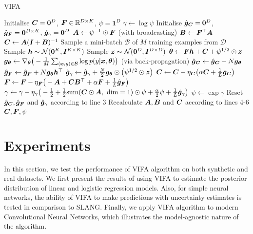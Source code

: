 \documentclass[10pt]{article} %
\begin{document}
\begin{algorithm}[H] 
	\caption{VIFA}
	\label{alg:vi_fa}
	\begin{algorithmic}[1]
		\State Initialise ${\bm{C}} = \bm{0}^D$, ${\bm{F}} \in \mathbb{R}^{D \times K}$, $\psi = \bm{1}^D$
		\State $\gamma \leftarrow \log \psi$
		\State Initialise $\hat{{\bm{g}}}_{\bm{C}} = \bm{0}^D$, $\hat{{\bm{g}}}_{\bm{F}} = \bm{0}^{D \times K}$, $\hat{{\bm{g}}}_\gamma = \bm{0}^D$
		\State ${\bm{A}} \leftarrow \psi^{-1} \odot {\bm{F}}$ (with broadcasting)
		\State ${\bm{B}} \leftarrow {\bm{F}}^\top {\bm{A}}$
		\State ${\bm{C}} \leftarrow {\bm{A}} ({\bm{I}} + {\bm{B}})^{-1}$
			\State Sample a mini-batch $\mathcal{B}$ of $M$ training examples from $\mathcal{D}$
			\State Sample ${\bm{h}} \sim \mathcal{N}(\bm{0}^K, {\bm{I}}^{K \times K})$
			\State Sample ${\bm{z}} \sim \mathcal{N}(\bm{0}^D, {\bm{I}}^{D \times D})$
			\State ${\bm{\theta}} \leftarrow {\bm{F}} {\bm{h}} + {\bm{C}} + \psi^{1/2} \odot {\bm{z}}$
			\State ${\bm{g}}_{\bm{\theta}} \leftarrow \nabla_{\bm{\theta}} \big(-\frac{1}{M} \sum_{({\bm{x}}, y) \in \mathcal{B}} \log p(y | {\bm{x}}, {\bm{\theta}})\big)$ 
			(via back-propagation)
			\State $\hat{{\bm{g}}}_{\bm{C}} \leftarrow \hat{{\bm{g}}}_{\bm{C}} + N {\bm{g}}_{\bm{\theta}}$
			\State $\hat{{\bm{g}}}_{\bm{F}} \leftarrow \hat{{\bm{g}}}_{\bm{F}} + N {\bm{g}}_{\bm{\theta}} {\bm{h}}^\top$
			\State $\hat{{\bm{g}}}_\gamma \leftarrow \hat{{\bm{g}}}_\gamma + \frac{N}{2} {\bm{g}}_{\bm{\theta}} \odot \big(\psi^{1/2} \odot {\bm{z}}\big)$
				\State ${\bm{C}} \leftarrow {\bm{C}} - \eta_{\bm{C}} \big(\alpha {\bm{C}} + \frac{1}{L}\hat{{\bm{g}}}_{\bm{C}}\big)$
				\State ${\bm{F}} \leftarrow {\bm{F}} - \eta_{\bm{F}} \big(-{\bm{A}}  + {\bm{C}} {\bm{B}}^\top+ \alpha {\bm{F}} +\frac{1}{L}\hat{{\bm{g}}}_{\bm{F}}\big)$
				\State $\gamma \leftarrow \gamma - \eta_\gamma \big(-\frac{1}{2} + \frac{1}{2} \text{sum}({\bm{C}} \odot {\bm{A}}, \text{ dim} = 1) \odot \psi +\frac{\alpha}{2} \psi  + \frac{1}{L}\hat{{\bm{g}}}_\gamma\big)$
				\State $\psi \leftarrow \exp \gamma$
				\State Reset $\hat{{\bm{g}}}_{\bm{C}}, \hat{{\bm{g}}}_{\bm{F}}$ and $\hat{{\bm{g}}}_\gamma$ according to line 3
				\State Recalculate ${\bm{A}}, {\bm{B}}$ and ${\bm{C}}$ according to lines 4-6
			\EndIf
		\EndFor
	\State \Return ${\bm{C}}, {\bm{F}}, \psi$
	\end{algorithmic}
\end{algorithm}
\section{Experiments}
\label{sec: Experiments}
In this section, we test the performance of VIFA algorithm on both synthetic and real datasets. We first present the results of using VIFA to estimate the posterior distribution of linear and logistic regression models. Also, for simple neural networks, the ability of VIFA to make predictions with uncertainty estimates is tested in comparison to SLANG. Finally, we apply VIFA algorithm to modern Convolutional Neural Networks, which illustrates the model-agnostic nature of the algorithm.
\end{document}
